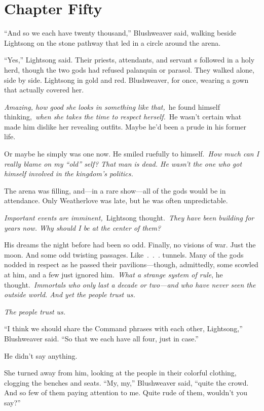 \section{Chapter Fifty}

“And so we each have twenty thousand,” Blushweaver said, walking beside Lightsong on the stone pathway that led in a circle around the arena.

“Yes,” Lightsong said. Their priests, attendants, and servant s followed in a holy herd, though the two gods had refused palanquin or parasol. They walked alone, side by side. Lightsong in gold and red. Blushweaver, for once, wearing a gown that actually covered her.

\textit{Amazing, how good she looks in something like that,}~he found himself thinking,~\textit{when she takes the time to respect herself.}~He wasn’t certain what made him dislike her revealing outfits. Maybe he’d been a prude in his former life.

Or maybe he simply was one now. He smiled ruefully to himself.~\textit{How much can I really blame on my “old” self? That man is dead. He wasn’t the one who got himself involved in the kingdom’s politics.}

The arena was filling, and—in a rare show—all of the gods would be in attendance. Only Weatherlove was late, but he was often unpredictable.

\textit{Important events are imminent,}~Lightsong thought.~\textit{They have been building for years now. Why should I be at the center of them?}

His dreams the night before had been so odd. Finally, no visions of war. Just the moon. And some odd twisting passages. Like~.~.~. tunnels. Many of the gods nodded in respect as he passed their pavilions—though, admittedly, some scowled at him, and a few just ignored him.~\textit{What a strange system of rule}, he thought.~\textit{Immortals who only last a decade or two—and who have never seen the outside world. And yet the people trust us.}

\textit{The people trust us.}

“I think we should share the Command phrases with each other, Lightsong,” Blushweaver said. “So that we each have all four, just in case.”

He didn’t say anything.

She turned away from him, looking at the people in their colorful clothing, clogging the benches and seats. “My, my,” Blushweaver said, “quite the crowd. And so few of them paying attention to me. Quite rude of them, wouldn’t you say?”

